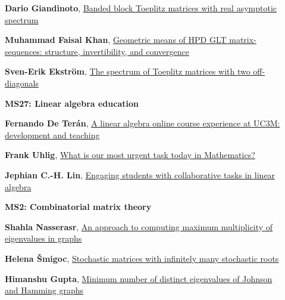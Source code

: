 \documentclass[ILAS2025-program.tex]{subfiles}
\begin{document}
\begin{description}
\begin{description}
    \item[] \hypertarget{up0256}{}\textbf{Dario Giandinoto}, \hyperlink{down0256}{Banded block Toeplitz matrices with real asymptotic spectrum
}
        \item[] \hypertarget{up0257}{}\textbf{Muhammad Faisal Khan}, \hyperlink{down0257}{Geometric means of HPD GLT matrix-sequences: structure, invertibility, and convergence}
        \item[] \hypertarget{up0258}{}\textbf{Sven-Erik Ekström}, \hyperlink{down0258}{The spectrum of Toeplitz matrices with two off-diagonals}
        \end{description}
    \begin{description}
    \item[] {\color{mstitle}\textbf{MS27: Linear algebra education}} 
    \item[] \hypertarget{up0259}{}\textbf{Fernando De Terán}, \hyperlink{down0259}{A linear algebra online course experience at UC3M: development and teaching}
        \item[] \hypertarget{up0260}{}\textbf{Frank Uhlig}, \hyperlink{down0260}{What is our most urgent task today in Mathematics?
}
        \item[] \hypertarget{up0261}{}\textbf{Jephian C.-H. Lin}, \hyperlink{down0261}{Engaging students with collaborative tasks in linear algebra
}
        \end{description}
    \begin{description}
    \item[] {\color{mstitle}\textbf{MS2: Combinatorial matrix theory}} 
    \item[] \hypertarget{up0262}{}\textbf{Shahla Nasserasr}, \hyperlink{down0262}{An approach to computing maximum multiplicity of eigenvalues in graphs}
        \item[] \hypertarget{up0263}{}\textbf{Helena Šmigoc}, \hyperlink{down0263}{Stochastic matrices with infinitely many stochastic roots}
        \item[] \hypertarget{up0264}{}\textbf{Himanshu Gupta}, \hyperlink{down0264}{Minimum number of distinct eigenvalues of Johnson and Hamming graphs}
        \end{description}
    \begin{description}

\end{description}
\end{description}
\end{document}

